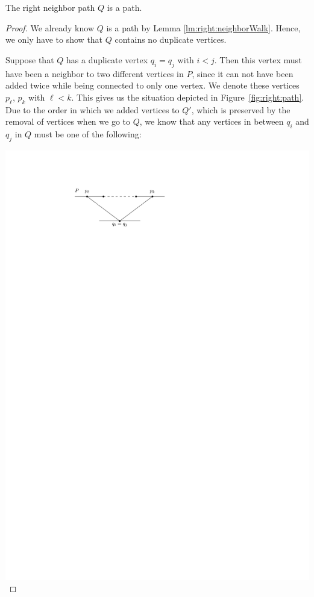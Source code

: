     \begin{lemma}
      \label{lm:right:neighborPath}
      The right neighbor path $Q$ is a path.
    \end{lemma}
    \begin{proof}
      We already know $Q$ is a path by Lemma \ref{lm:right:neighborWalk}. Hence, we only have to show that $Q$ contains no duplicate vertices.
      
      \vspace{2pt}
      \noindent
      \begin{minipage}[c]{0.5\linewidth}
      \setlength{\parindent}{15pt}
      Suppose that $Q$ has a duplicate vertex $q_i=q_j$ with $i<j$.
      Then this vertex must have been a neighbor to two different vertices in $P$, since it can not have been added twice while being connected to only one vertex.
      We denote these vertices $p_\ell$, $p_k$ with $\ell<k$.
      This gives us the situation depicted in Figure~\ref{fig:right:path}.
      Due to the order in which we added vertices to $Q'$, which is preserved by the removal of vertices when we go to $Q$, we know that any vertices in between $q_i$ and $q_j$ in $Q$ must be one of the following:
      \end{minipage}
      \hfill
      \begin{minipage}[c]{0.5\linewidth}
        \centering
        \includegraphics[scale=1]{unifiedAlgo/img/rightNeighbourwalk/neighborPathisPath.pdf}
        \label{fig:right:path}
      \end{minipage}


\end{proof}
